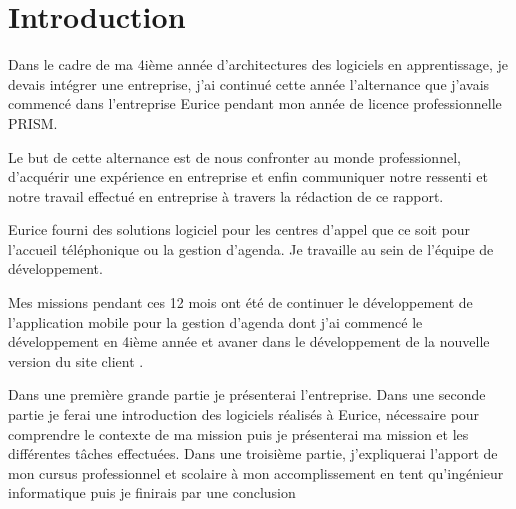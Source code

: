 \chapter{Introduction}

Dans le cadre de ma 4ième année d'architectures des logiciels en apprentissage, 
je devais intégrer une entreprise, j'ai continué cette année l'alternance que j'avais commencé 
dans l'entreprise Eurice pendant mon année de licence professionnelle PRISM.\newline

Le but de cette alternance est de nous confronter au monde professionnel, 
d’acquérir une expérience en entreprise et enfin communiquer notre ressenti et 
notre travail effectué en entreprise à travers la rédaction de ce rapport. \newline

Eurice fourni des solutions logiciel pour les centres d'appel 
que ce soit pour l'accueil téléphonique ou la gestion d'agenda. 
Je travaille au sein de l’équipe de développement. 

Mes missions pendant ces 12 mois ont été de continuer le développement de l'application mobile pour la gestion d'agenda
dont j'ai commencé le développement en 4ième année et avaner dans le développement de la nouvelle version du site client . \newline

Dans une première grande partie je présenterai l’entreprise. 
Dans une seconde partie je ferai une introduction des logiciels réalisés à Eurice, 
nécessaire pour comprendre le contexte de ma mission 
puis je présenterai ma mission et les différentes tâches effectuées.
Dans une troisième partie, j'expliquerai l'apport de mon cursus professionnel et scolaire à mon accomplissement
en tent qu'ingénieur informatique puis je finirais par une conclusion \newline


